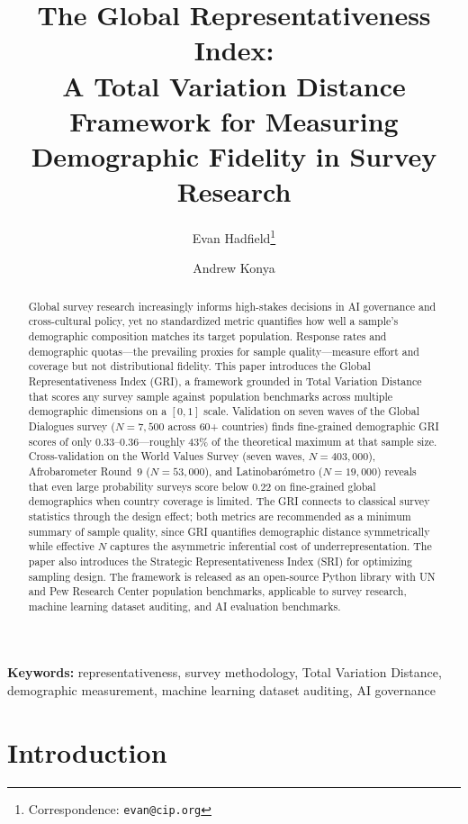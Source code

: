 \documentclass[11pt,a4paper]{article}
\title{The Global Representativeness Index:\\A Total Variation Distance Framework for Measuring\\Demographic Fidelity in Survey Research}
\author{Evan Hadfield\thanks{Correspondence: \texttt{evan@cip.org}} \and Andrew Konya}
\date{}
\begin{document}
\maketitle

\begin{abstract}
Global survey research increasingly informs high-stakes decisions in AI governance and cross-cultural policy, yet no standardized metric quantifies how well a sample's demographic composition matches its target population. Response rates and demographic quotas---the prevailing proxies for sample quality---measure effort and coverage but not distributional fidelity. This paper introduces the Global Representativeness Index (GRI), a framework grounded in Total Variation Distance that scores any survey sample against population benchmarks across multiple demographic dimensions on a $[0, 1]$ scale. Validation on seven waves of the Global Dialogues survey ($N = 7{,}500$ across 60+ countries) finds fine-grained demographic GRI scores of only 0.33--0.36---roughly 43\% of the theoretical maximum at that sample size. Cross-validation on the World Values Survey (seven waves, $N = 403{,}000$), Afrobarometer Round~9 ($N = 53{,}000$), and Latinobar\'{o}metro ($N = 19{,}000$) reveals that even large probability surveys score below 0.22 on fine-grained global demographics when country coverage is limited. The GRI connects to classical survey statistics through the design effect; both metrics are recommended as a minimum summary of sample quality, since GRI quantifies demographic distance symmetrically while effective $N$ captures the asymmetric inferential cost of underrepresentation. The paper also introduces the Strategic Representativeness Index (SRI) for optimizing sampling design. The framework is released as an open-source Python library with UN and Pew Research Center population benchmarks, applicable to survey research, machine learning dataset auditing, and AI evaluation benchmarks.
\end{abstract}

\noindent\textbf{Keywords:} representativeness, survey methodology, Total Variation Distance, demographic measurement, machine learning dataset auditing, AI governance

\section{Introduction}
\end{document}
